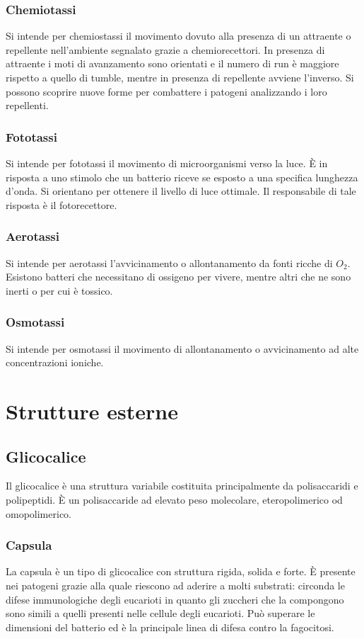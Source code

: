 		\subsubsection{Chemiotassi}
		Si intende per chemiostassi il movimento dovuto alla presenza di un attraente o repellente nell'ambiente segnalato grazie a chemiorecettori.
		In presenza di attraente i moti di avanzamento sono orientati e il numero di run \`e maggiore rispetto a quello di tumble, mentre in presenza di repellente avviene l'inverso.
		Si possono scoprire nuove forme per combattere i patogeni analizzando i loro repellenti.

		\subsubsection{Fototassi}
		Si intende per fototassi il movimento di microorganismi verso la luce.
		\`E in risposta a uno stimolo che un batterio riceve se esposto a una specifica lunghezza d'onda.
		Si orientano per ottenere il livello di luce ottimale.
		Il responsabile di tale risposta \`e il fotorecettore.

		\subsubsection{Aerotassi}
		Si intende per aerotassi l'avvicinamento o allontanamento da fonti ricche di \emph{$O_2$}.
		Esistono batteri che necessitano di ossigeno per vivere, mentre altri che ne sono inerti o per cui \`e tossico.

		\subsubsection{Osmotassi}
		Si intende per osmotassi il movimento di allontanamento o avvicinamento ad alte concentrazioni ioniche.

\section{Strutture esterne}

	\subsection{Glicocalice}
	Il glicocalice \`e una struttura variabile costituita principalmente da polisaccaridi e polipeptidi.
	\`E un polisaccaride ad elevato peso molecolare, eteropolimerico od omopolimerico.

		\subsubsection{Capsula}
		La capsula \`e un tipo di glicocalice con struttura rigida, solida e forte.
		\`E presente nei patogeni grazie alla quale riescono ad aderire a molti substrati: circonda le difese immunologiche degli eucarioti in quanto gli zuccheri che la compongono sono simili a quelli presenti nelle cellule degli eucarioti.
		Pu\`o superare le dimensioni del batterio ed \`e la principale linea di difesa contro la fagocitosi.

